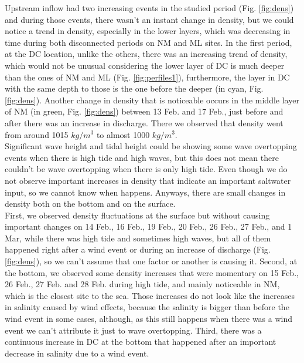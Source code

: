 \documentclass[tesis.tex]{subfiles}
\begin{document}
Upstream inflow had two increasing events in the studied period (Fig. \ref{fig:dens}) and during those events, there wasn't an instant change in density, but we could notice a trend in density, especially in the lower layers, which was decreasing in time during both disconnected periods on NM and ML sites. In the first period, at the DC location, unlike the others, there was an increasing trend of density, which would not be unusual considering the lower layer of DC is much deeper than the ones of NM and ML (Fig. \ref{fig:perfiles1}), furthermore, the layer in DC with the same depth to those is the one before the deeper (in cyan, Fig. \ref{fig:dens}). Another change in density that is noticeable occurs in the middle layer of NM (in green, Fig. \ref{fig:dens}) between 13 Feb. and 17 Feb., just before and after there was an increase in discharge. There we observed that density went from around 1015 $kg/m^3$ to almost 1000 $kg/m^3$. \\

Significant wave height and tidal height could be showing some wave overtopping events when there is high tide and high waves, but this does not mean there couldn't be wave overtopping when there is only high tide. Even though we do not observe important increases in density that indicate an important saltwater input, so we cannot know when happens. Anyways, there are small changes in density both on the bottom and on the surface.\\

First, we observed density fluctuations at the surface but without causing important changes on 14 Feb., 16 Feb., 19 Feb., 20 Feb., 26 Feb., 27 Feb., and 1 Mar, while there was high tide and sometimes high waves, but all of them happened right after a wind event or during an increase of discharge (Fig. \ref{fig:dens}), so we can't assume that one factor or another is causing it. Second, at the bottom, we observed some density increases that were momentary on 15 Feb., 26 Feb., 27 Feb. and 28 Feb. during high tide, and mainly noticeable in NM, which is the closest site to the sea. Those increases do not look like the increases in salinity caused by wind effects, because the salinity is bigger than before the wind event in some cases, although, as this still happens when there was a wind event we can't attribute it just to wave overtopping. Third, there was a continuous increase in DC at the bottom that happened after an important decrease in salinity due to a wind event.\\
\end{document}

